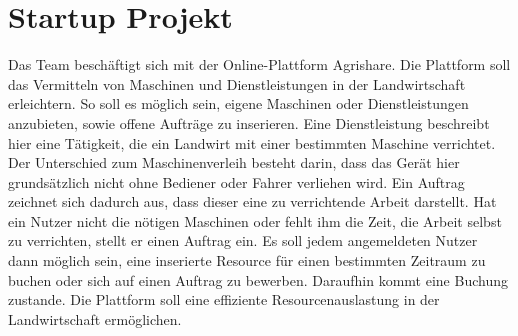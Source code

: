 \section{Startup Projekt}
Das Team beschäftigt sich mit der Online-Plattform Agrishare. Die Plattform soll das Vermitteln von Maschinen und Dienstleistungen in der Landwirtschaft erleichtern. So soll es möglich sein, eigene Maschinen oder Dienstleistungen anzubieten, sowie offene Aufträge zu inserieren. Eine Dienstleistung beschreibt hier eine Tätigkeit, die ein Landwirt mit einer bestimmten Maschine verrichtet. Der Unterschied zum Maschinenverleih besteht darin, dass das Gerät hier grundsätzlich nicht ohne Bediener oder Fahrer verliehen wird. Ein Auftrag zeichnet sich dadurch aus, dass dieser eine zu verrichtende Arbeit darstellt. Hat ein Nutzer nicht die nötigen Maschinen oder fehlt ihm die Zeit, die Arbeit selbst zu verrichten, stellt er einen Auftrag ein. Es soll jedem angemeldeten Nutzer dann möglich sein, eine inserierte Resource für einen bestimmten Zeitraum zu buchen oder sich auf einen Auftrag zu bewerben. Daraufhin kommt eine Buchung zustande. Die Plattform soll eine effiziente Resourcenauslastung in der Landwirtschaft ermöglichen.